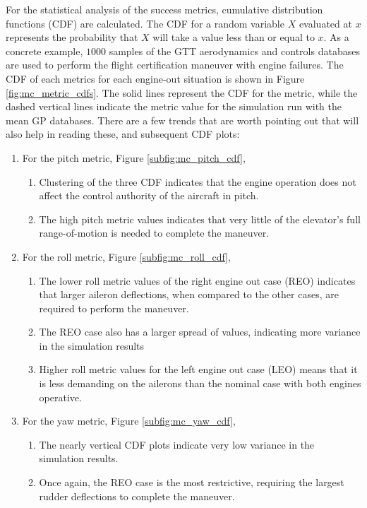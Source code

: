 For the statistical analysis of the success metrics, cumulative distribution functions (CDF) are calculated.
The CDF for a random variable $X$ evaluated at $x$ represents the probability that $X$ will take a value less than or equal to $x$.
As a concrete example, $1000$ samples of the GTT aerodynamics and controls databases are used to perform the flight certification maneuver with engine failures. 
The CDF of each metrics for each engine-out situation is shown in Figure \ref{fig:mc_metric_cdfs}.
The solid lines represent the CDF for the metric, while the dashed vertical lines indicate the metric value for the simulation run with the mean GP databases.
There are a few trends that are worth pointing out that will also help in reading these, and subsequent CDF plots:

\begin{enumerate}
    \item For the pitch metric, Figure \ref{subfig:mc_pitch_cdf},
    \begin{enumerate}
        \item Clustering of the three CDF indicates that the engine operation does not affect the control authority of the aircraft in pitch.
        \item The high pitch metric values indicates that very little of the elevator's full range-of-motion is needed to complete the maneuver.
    \end{enumerate}
    \item For the roll metric, Figure \ref{subfig:mc_roll_cdf},
    \begin{enumerate}
        \item The lower roll metric values of the right engine out case (REO) indicates that larger aileron deflections, when compared to the other cases, are required to perform the maneuver.
        \item The REO case also has a larger spread of values, indicating more variance in the simulation results
        \item Higher roll metric values for the left engine out case (LEO) means that it is less demanding on the ailerons than the nominal case with both engines operative. 
    \end{enumerate}
    \item For the yaw metric, Figure \ref{subfig:mc_yaw_cdf},
    \begin{enumerate}
        \item The nearly vertical CDF plots indicate very low variance in the simulation results.
        \item Once again, the REO case is the most restrictive, requiring the largest rudder deflections to complete the maneuver. 
    \end{enumerate}
\end{enumerate}

